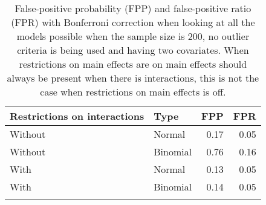 \begin{longtable}{llrr}
\caption{False-positive probability (FPP) and false-positive ratio (FPR) with Bonferroni correction when looking at all the models possible when the sample size is 200, no outlier criteria is being used and having two covariates. When restrictions on main effects are on main effects should always be present when there is interactions, this is not the case when restrictions on main effects is off.} \\ 
  \hline
Restrictions on interactions & Type & FPP & FPR \\ 
  \hline
Without & Normal & 0.17 & 0.05 \\ 
  Without & Binomial & 0.76 & 0.16 \\ 
  With & Normal & 0.13 & 0.05 \\ 
  With & Binomial & 0.14 & 0.05 \\ 
   \hline
\hline
\label{tab:resultFullBC}
\end{longtable}
